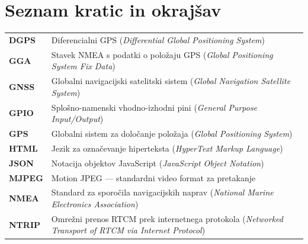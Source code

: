 \documentclass[12pt]{article}
\newcommand{\romanpages}{%
    \setcounter{page}{1}%
    \pagenumbering{Roman}%
    \pagestyle{fancy}%
    \fancyhf{}%
    \fancyfoot[C]{\thepage}%
}
\begin{document}
\vfill

\newpage
\romanpages
\tableofcontents

\newpage
\listoffigures

\newpage
\section*{Seznam kratic in okrajšav}
\begin{samepage}
\begingroup
\singlespacing
\small
\begin{tabularx}{\textwidth}{@{}lX@{}}
  \textbf{DGPS}  & Diferencialni GPS (\textit{Differential Global
                   Positioning System}) \\
  \textbf{GGA}   & Stavek NMEA s podatki o položaju GPS
                   (\textit{Global Positioning System Fix Data}) \\
  \textbf{GNSS}  & Globalni navigacijski satelitski sistem
                   (\textit{Global Navigation Satellite System}) \\
  \textbf{GPIO}  & Splošno-namenski vhodno-izhodni pini
                   (\textit{General Purpose Input/Output}) \\
  \textbf{GPS}   & Globalni sistem za določanje položaja
                   (\textit{Global Positioning System}) \\
  \textbf{HTML}  & Jezik za označevanje hiperteksta
                   (\textit{HyperText Markup Language}) \\
  \textbf{JSON}  & Notacija objektov JavaScript
                   (\textit{JavaScript Object Notation}) \\
  \textbf{MJPEG} & Motion JPEG --- standardni video format za pretakanje \\
  \textbf{NMEA}  & Standard za sporočila navigacijskih naprav
                   (\textit{National Marine Electronics Association}) \\
  \textbf{NTRIP} & Omrežni prenos RTCM prek internetnega protokola
                   (\textit{Networked Transport of RTCM via Internet
                   Protocol}) \\

\end{tabularx}
\end{samepage}
\end{document}
